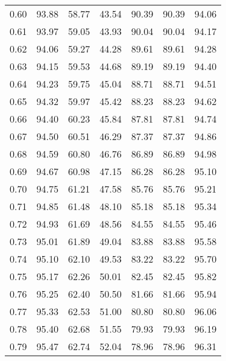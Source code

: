 \begin{tabular}{|c|c|c|c|c|c|c|}
      0.60 &     93.88 &     58.77 &      43.54 &   90.39 &      90.39 &         94.06 \\
      0.61 &     93.97 &     59.05 &      43.93 &   90.04 &      90.04 &         94.17 \\
      0.62 &     94.06 &     59.27 &      44.28 &   89.61 &      89.61 &         94.28 \\
      0.63 &     94.15 &     59.53 &      44.68 &   89.19 &      89.19 &         94.40 \\
      0.64 &     94.23 &     59.75 &      45.04 &   88.71 &      88.71 &         94.51 \\
      0.65 &     94.32 &     59.97 &      45.42 &   88.23 &      88.23 &         94.62 \\
      0.66 &     94.40 &     60.23 &      45.84 &   87.81 &      87.81 &         94.74 \\
      0.67 &     94.50 &     60.51 &      46.29 &   87.37 &      87.37 &         94.86 \\
      0.68 &     94.59 &     60.80 &      46.76 &   86.89 &      86.89 &         94.98 \\
      0.69 &     94.67 &     60.98 &      47.15 &   86.28 &      86.28 &         95.10 \\
      0.70 &     94.75 &     61.21 &      47.58 &   85.76 &      85.76 &         95.21 \\
      0.71 &     94.85 &     61.48 &      48.10 &   85.18 &      85.18 &         95.34 \\
      0.72 &     94.93 &     61.69 &      48.56 &   84.55 &      84.55 &         95.46 \\
      0.73 &     95.01 &     61.89 &      49.04 &   83.88 &      83.88 &         95.58 \\
      0.74 &     95.10 &     62.10 &      49.53 &   83.22 &      83.22 &         95.70 \\
      0.75 &     95.17 &     62.26 &      50.01 &   82.45 &      82.45 &         95.82 \\
      0.76 &     95.25 &     62.40 &      50.50 &   81.66 &      81.66 &         95.94 \\
      0.77 &     95.33 &     62.53 &      51.00 &   80.80 &      80.80 &         96.06 \\
      0.78 &     95.40 &     62.68 &      51.55 &   79.93 &      79.93 &         96.19 \\
      0.79 &     95.47 &     62.74 &      52.04 &   78.96 &      78.96 &         96.31 \\

\end{tabular}
